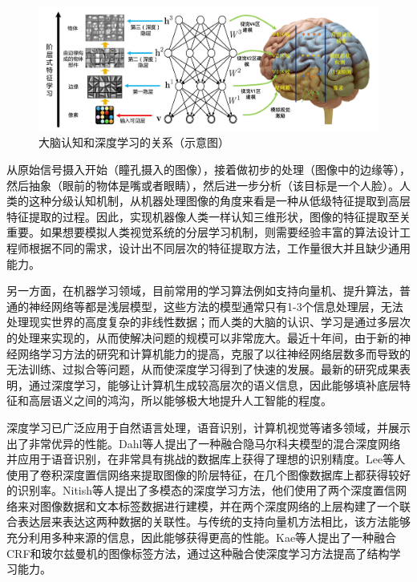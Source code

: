 \documentclass[twoside,UTF8]{nputhesis}
\begin{document}
\begin{figure}[tb]
\begin{center}
\includegraphics[width=0.9\linewidth]{figures/1-3.jpg} 
\end{center} 
\vspace{-4mm}
\caption{大脑认知和深度学习的关系（示意图）} \label{fig_brain}
\end{figure}

从原始信号摄入开始（瞳孔摄入的图像），接着做初步的处理（图像中的边缘等），然后抽象（眼前的物体是嘴或者眼睛），然后进一步分析（该目标是一个人脸）。人类的这种分级认知机制，从机器处理图像的角度来看是一种从低级特征提取到高层特征提取的过程。因此，实现机器像人类一样认知三维形状，图像的特征提取至关重要。如果想要模拟人类视觉系统的分层学习机制，则需要经验丰富的算法设计工程师根据不同的需求，设计出不同层次的特征提取方法，工作量很大并且缺少通用能力。

另一方面，在机器学习领域，目前常用的学习算法例如支持向量机、提升算法，普通的神经网络等都是浅层模型，这些方法的模型通常只有1-3个信息处理层，无法处理现实世界的高度复杂的非线性数据；而人类的大脑的认识、学习是通过多层次的处理来实现的，从而使解决问题的规模可以非常庞大。最近十年间，由于新的神经网络学习方法的研究和计算机能力的提高，克服了以往神经网络层数多而导致的无法训练、过拟合等问题，从而使深度学习得到了快速的发展。最新的研究成果表明，通过深度学习，能够让计算机生成较高层次的语义信息，因此能够填补底层特征和高层语义之间的鸿沟，所以能够极大地提升人工智能的程度。

深度学习已广泛应用于自然语言处理，语音识别，计算机视觉等诸多领域，并展示出了非常优异的性能\cite{Krizhevsky2017ImageNet, He2015Delving, Mnih2015Human}。Dahl等人\cite{Dahl2012Context}提出了一种融合隐马尔科夫模型的混合深度网络并应用于语音识别，在非常具有挑战的数据库上获得了理想的识别精度。Lee等人\cite{Honglak2009Convolutional}使用了卷积深度置信网络来提取图像的阶层特征，在几个图像数据库上都获得较好的识别率。Nitish等人\cite{Srivastava2012Multimodal}提出了多模态的深度学习方法，他们使用了两个深度置信网络来对图像数据和文本标签数据进行建模，并在两个深度网络的上层构建了一个联合表达层来表达这两种数据的关联性。与传统的支持向量机方法相比，该方法能够充分利用多种来源的信息，因此能够获得更高的性能。Kae等人\cite{Kae2013Augmenting}提出了一种融合CRF和玻尔兹曼机的图像标签方法，通过这种融合使深度学习方法提高了结构学习能力。
\end{document}
